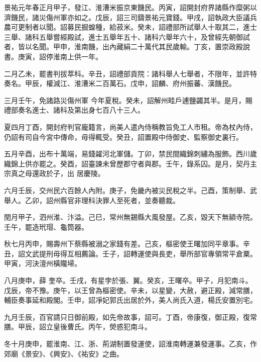 \begin{pinyinscope}
 景祐元年春正月甲子，發江、淮漕米振京東饑民。丙寅，詔開封府界諸縣作糜粥以濟饑民，諸災傷州軍亦如之。戊辰，詔三司鑄景祐元寶錢。甲戌，詔執政大臣議兵
 農可更制者以聞。詔募民掘蝗種，給菽米。癸未，詔禮部所試舉人十取其二，進士三舉、諸科五舉嘗經殿試，進士五舉年五十、諸科六舉年六十，及曾經先朝御試者，皆以名聞。甲申，淮南饑，出內藏絹二十萬代其民歲輸。丁亥，置崇政殿說書。庚寅，詔停淮南上供一年。



 二月乙未，罷書判拔萃科。辛丑，詔禮部貢院：諸科舉人七舉者，不限年，並許特奏名。甲辰，權減江、淮漕米二百萬石。戊申，詔麟、府州振蕃、漢饑民。



 三月壬午，免諸路災傷州軍
 今年夏稅。癸未，詔解州畦戶逋鹽蠲其半。是月，賜禮部奏名進士、諸科及第出身七百八十三人。



 夏四月丁酉，開封府判官龐籍言，尚美人遣內侍稱教旨免工人市租。帝為杖內侍，仍詔有司自今宮中傳命，毋得輒受。癸丑，詔置殿中侍御史、監察御史裏行。



 五月辛酉，出布十萬端，易錢糴河北軍儲。丁卯，禁民間織錦刺繡為服飾。西川歲織錦上供亦罷之。癸酉，詔臺諫未曾歷郡守者與郡。壬午，錄系囚。是月，契丹主宗真之母還政於子，出
 居慶陵。



 六月壬辰，交州民六百餘人內附。庚子，免畿內被災民稅之半。己酉，策制舉、武舉人。乙卯，詔州縣官非理科決罪人至死者，並奏聽裁。



 閏月甲子，泗州淮、汴溢。己巳，常州無錫縣大風發屋。乙亥，毀天下無額寺院。壬午，罷造玳瑁、龜筒器。



 秋七月丙申，賜壽州下蔡縣被溺之家錢有差。己亥，樞密使王曙加同平章事。辛丑，詔文武提刑毋得互相薦論。壬子，詔轉運使與長吏，舉所部官專領常平倉粟。甲寅，河決澶州橫隴埽。



 八月庚申，薛
 奎卒。壬戌，有星孛於張、翼。癸亥，王曙卒。甲子，月犯南斗。戊辰，帝不豫。庚午，以王曾為樞密使。辛未，以星變，大赦，避正殿，減常膳，輔臣奏事延和殿閣。壬申，詔凈妃郭氏出居於外，美人尚氏入道，楊氏安置別宅。



 九月壬辰，百官請只日御前殿，如先帝故事，詔可。丁酉，帝康復，御正殿，復常膳。甲辰，詔立皇後曹氏。丙午，熒惑犯南斗。



 冬十月庚申，罷淮南、江、浙、荊湖制置發運使，詔淮南轉運兼發運事。乙亥，作郊廟《景安》、《興安》、《祐安》之曲。




\end{pinyinscope}
